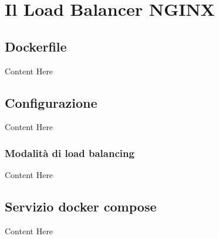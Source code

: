 \documentclass[../DocumentazioneProgetto.tex]{subfiles}
\begin{document}
	\section{Il Load Balancer NGINX} 
	\subsection{Dockerfile} 
	Content Here
	\subsection{Configurazione} 
	Content Here
	\subsubsection{Modalità di load balancing} 
	Content Here
\subsection{Servizio docker compose} 
Content Here
\end{document}
